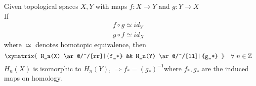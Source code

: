 \documentclass[11pt,a4paper]{report}
\begin{document}
        \begin{thm} \label{homotopic}
         Given topological spaces $X, Y$ with maps $f: X \rightarrow Y$ and $g: Y \rightarrow X$ \\ 
         If 
         \begin{align*}
         f \circ g \simeq id_Y \\
         g \circ f \simeq id_X
         \end{align*}
         where $\simeq$ denotes homotopic equivalence, then
        \[
                    \xymatrix{
                        H_n(X) \ar@/^/[rr]|{f_*}
                        && H_n(Y) \ar@/^/[ll]|{g_*} }
                       \quad  \forall \ n \in \ZZ
          \] $H_n(X)$ is isomorphic to $H_n(Y)$, $ \Rightarrow f_* = (g_*)^{-1} $where $f_*, g_*$ are the induced maps on homology. 
        \end{thm}
\end{document}
